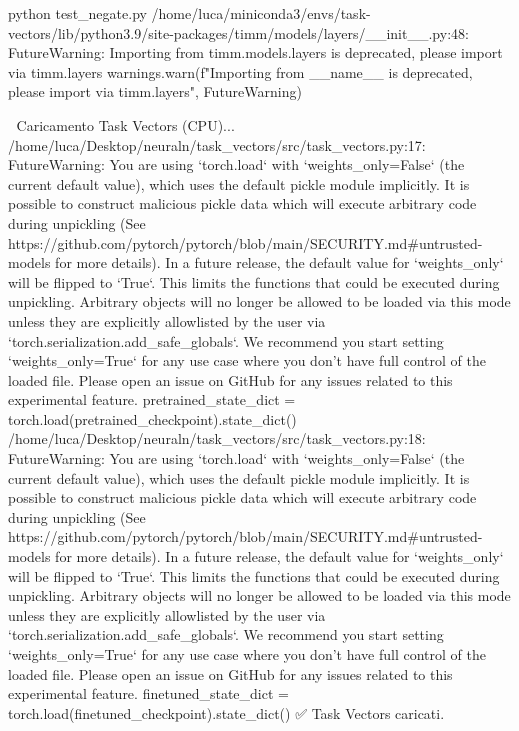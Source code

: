 python test_negate.py 
/home/luca/miniconda3/envs/task-vectors/lib/python3.9/site-packages/timm/models/layers/__init__.py:48: FutureWarning: Importing from timm.models.layers is deprecated, please import via timm.layers
  warnings.warn(f"Importing from {__name__} is deprecated, please import via timm.layers", FutureWarning)

🔄 Caricamento Task Vectors (CPU)...
/home/luca/Desktop/neuraln/task_vectors/src/task_vectors.py:17: FutureWarning: You are using `torch.load` with `weights_only=False` (the current default value), which uses the default pickle module implicitly. It is possible to construct malicious pickle data which will execute arbitrary code during unpickling (See https://github.com/pytorch/pytorch/blob/main/SECURITY.md#untrusted-models for more details). In a future release, the default value for `weights_only` will be flipped to `True`. This limits the functions that could be executed during unpickling. Arbitrary objects will no longer be allowed to be loaded via this mode unless they are explicitly allowlisted by the user via `torch.serialization.add_safe_globals`. We recommend you start setting `weights_only=True` for any use case where you don't have full control of the loaded file. Please open an issue on GitHub for any issues related to this experimental feature.
  pretrained_state_dict = torch.load(pretrained_checkpoint).state_dict()
/home/luca/Desktop/neuraln/task_vectors/src/task_vectors.py:18: FutureWarning: You are using `torch.load` with `weights_only=False` (the current default value), which uses the default pickle module implicitly. It is possible to construct malicious pickle data which will execute arbitrary code during unpickling (See https://github.com/pytorch/pytorch/blob/main/SECURITY.md#untrusted-models for more details). In a future release, the default value for `weights_only` will be flipped to `True`. This limits the functions that could be executed during unpickling. Arbitrary objects will no longer be allowed to be loaded via this mode unless they are explicitly allowlisted by the user via `torch.serialization.add_safe_globals`. We recommend you start setting `weights_only=True` for any use case where you don't have full control of the loaded file. Please open an issue on GitHub for any issues related to this experimental feature.
  finetuned_state_dict = torch.load(finetuned_checkpoint).state_dict()
✅ Task Vectors caricati.


